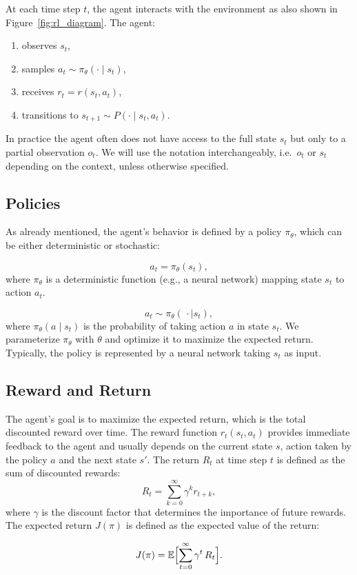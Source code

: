 At each time step \(t\), the agent interacts with the environment as also shown in Figure~\ref{fig:rl_diagram}. The agent:
\begin{enumerate}
  \item observes \(s_t\),
  \item samples \(a_t\sim\pi_\theta(\cdot\mid s_t)\),
  \item receives \(r_t = r(s_t,a_t)\),
  \item transitions to \(s_{t+1}\sim P(\cdot\mid s_t,a_t)\).
\end{enumerate}
In practice the agent often does not have access to the full state \(s_t\) but only to a partial observation \(o_t\).  We will use the notation interchangeably, i.e.\ \(o_t\) or \(s_t\) depending on the context, unless otherwise specified.
\subsection{Policies}
As already mentioned, the agent's behavior is defined by a policy \(\pi_\theta\), which can be either deterministic or stochastic:
 
    \[
      a_t = \pi_{\theta}(s_t),
    \]
    where \(\pi_{\theta}\) is a deterministic function (e.g., a neural network) mapping state \(s_t\) to action \(a_t\).

    \[
      a_t \sim \pi_{\theta}(\,\cdot\mid s_t),
    \]
    where \(\pi_{\theta}(a\mid s_t)\) is the probability of taking action \(a\) in state \(s_t\).
We parameterize \(\pi_{\theta}\) with \(\theta\) and optimize it to maximize the expected return. Typically, the policy is represented by a neural network taking \(s_t\) as input.

\subsection{Reward and Return}
The agent's goal is to maximize the expected return, which is the total discounted reward over time. 
The reward function \(r_t(s_t,a_t)\) provides immediate feedback to the agent and usually depends on the current state \(s\), action taken by the policy \(a\) and the next state \(s'\). The return \(R_t\) at time step \(t\) is defined as the sum of discounted rewards:
\[
R_t = \sum_{k=0}^{\infty} \gamma^k r_{t+k},
\]
where \(\gamma\) is the discount factor that determines the importance of future rewards. The expected return \(J(\pi)\) is defined as the expected value of the return:

\[
J(\pi) = \mathbb{E}\Bigl[\sum_{t=0}^\infty \gamma^t\,R_t\Bigr].
\]

